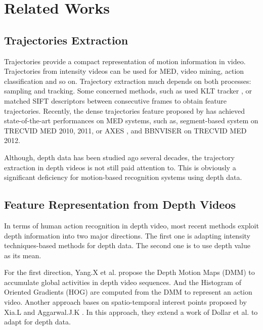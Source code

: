 \documentclass[review]{elsarticle}
\begin{document}
\section{Related Works}
\label{lbl:RelatedWorks}

\subsection{Trajectories Extraction}

Trajectories provide a compact representation of motion information in video. Trajectories from intensity videos can be used for MED, video mining, action classification and so on. Trajectory extraction much depends on both processes: sampling and tracking. Some concerned methods, such as \cite{matikainen2009trajectons, messing2009activity} used KLT tracker \cite{lucas1981iterative}, or \cite{sun2009hierarchical} matched  SIFT descriptors between consecutive frames to obtain feature trajectories. Recently, the dense trajectories feature proposed by \cite{wang2011densetraj} has achieved state-of-the-art performances on MED systems, such as, segment-based system \cite{phan2014multimedia} on TRECVID MED 2010, 2011, or AXES \cite{oneata2012axes}, and BBNVISER \cite{natarajan2012bbn} on TRECVID MED 2012.

Although, depth data has been studied ago several decades, the trajectory extraction in depth videos is not still paid attention to. This is obviously a significant deficiency for motion-based recognition systems using depth data.

\subsection{Feature Representation from Depth Videos}
In terms of human action recognition in depth video, most recent methods exploit depth information into two major directions. The first one is adapting intensity techniques-based methods for depth data. The second one is to use depth value as its mean.

For the first direction, Yang.X et al. \cite{yang2012recognizing} propose the Depth Motion Maps (DMM) to accumulate global activities in depth video sequences. And the Histogram of Oriented Gradients (HOG) are computed from the DMM to represent an action video. Another approach bases on spatio-temporal interest points proposed by Xia.L and Aggarwal.J.K \cite{xia2013spatio}. In this approach, they extend a work of Dollar et al. \cite{dollar2005behavior} to adapt for depth data.
\end{document}
